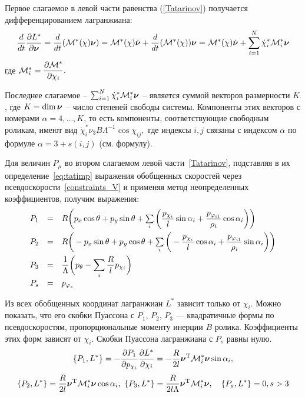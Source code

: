 Первое слагаемое в левой части равенства (\ref{Tatarinov}) получается дифференцированием лагранжиана:
\begin{equation}\label{DLStarDnuDdt}
    \frac{d}{dt}\frac{\partial L^{*}}{\partial \boldsymbol{\mathbf{\nu}}} = \frac{d}{dt}(\mathcal{M}^*(\chi)\boldsymbol{\mathbf{\nu}}) = 
    \mathcal{M}^*(\chi)\dot{\boldsymbol{\mathbf{\nu}}} +
    \frac{d}{dt}(\mathcal{M}^*(\chi))\boldsymbol{\mathbf{\nu}} =
    \mathcal{M}^*(\chi)\dot{\boldsymbol{\mathbf{\nu}}} +
    \sum_{i=1}^{N}\dot{\chi}_i^*\mathcal{M}^*_i\boldsymbol{\mathbf{\nu}}
\end{equation}
где $\mathcal{M}^*_i = \displaystyle\frac{\displaystyle \partial \mathcal{M}^*}{\displaystyle \partial \chi_i}.$

Последнее слагаемое -- $\sum_{i=1}^{N}\dot{\chi}_i^*\mathcal{M}^*_i\boldsymbol{\mathbf{\nu}}$ -- является суммой векторов размерности $K$, где $K = \dim\boldsymbol{\mathbf{\nu}}$ -- число степеней свободы системы. Компоненты этих векторов с номерами $\alpha = 4,\dots, K$, то есть компоненты, соответствующие свободным роликам, имеют вид $\dot{\chi}_i^*\nu_3B\Lambda^{-1}\cos\chi_{ij},$ где индексы $i,j$ связаны с индексом $\alpha$ по формуле $\alpha = 3 + s(i, j)$ (см. формулу).

Для величин $P_\mu$ во втором слагаемом левой части~\ref{Tatarinov}, подставляя в их определение~\ref{eq:tatimp} выражения обобщенных скоростей через псевдоскорости~\ref{constraints_V} и применяя метод неопределенных коэффициентов, получим выражения:
\begin{equation}\label{P}
    \begin{array}{rcl}
        P_1 & = & R\bigg(p_x\cos\theta + p_y\sin\theta + \sum\limits_{i}\bigg(\ddfrac{p_{\chi_i}}{l}\sin\alpha_i +  \ddfrac{p_{\phi_{i1}}}{\rho_i}\cos\alpha_i\bigg)\bigg)\vsp
        P_2 & = & R\bigg(-p_x\sin\theta + p_y\cos\theta + \sum\limits_{i}\bigg(-\ddfrac{p_{\chi_i}}{l}\cos\alpha_i +  \ddfrac{p_{\phi_{i1}}}{\rho_i}\sin\alpha_i\bigg)\bigg)\vsp
        P_3 & = & \ddfrac{1}{\Lambda}\bigg(p_\theta - \sum\limits_{i}\ddfrac{R}{l}p_{\chi_i}\bigg)\vsp
        P_s & = & p_{\phi_s}
    \end{array}
\end{equation}

Из всех обобщенных координат лагранжиан $L^{*}$ зависит только от $\chi_i$. Можно показать, что его скобки Пуассона с $P_1$, $P_2$, $P_3$  --- квадратичные формы по псевдоскоростям, пропорциональные моменту инерции $B$ ролика. Коэффициенты этих форм зависят от $\chi_i$. Скобки Пуассона лагранжиана с $P_s$ равны нулю.
$$
\{P_1, L^*\} = -\frac{\partial P_1}{\partial p_{\chi_i}}\frac{\partial L^*}{\partial \chi_i} = -\frac{R}{2l}\boldsymbol{\mathbf{\nu}}^\mathrm{T}\mathcal{M}^*_i\boldsymbol{\mathbf{\nu}}\sin\alpha_i,
$$
$$
\{P_2, L^*\} = \frac{R}{2l}\boldsymbol{\mathbf{\nu}}^\mathrm{T}\mathcal{M}^*_i\boldsymbol{\mathbf{\nu}}\cos\alpha_i,\  
\{P_3, L^*\} = \frac{R}{2l\Lambda}\boldsymbol{\mathbf{\nu}}^\mathrm{T}\mathcal{M}^*_i\boldsymbol{\mathbf{\nu}},\quad \{P_s,L^*\} = 0, s>3
$$

